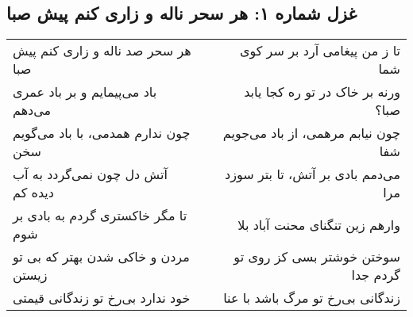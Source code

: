 \begin{center}
\section*{غزل شماره ۱: هر سحر ناله و زاری کنم پیش صبا}
\label{sec:001}
\begin{longtable}{l p{0.5cm} r}
هر سحر صد ناله و زاری کنم پیش صبا
&&
تا ز من پیغامی آرد بر سر کوی شما
\\
باد می‌پیمایم و بر باد عمری می‌دهم
&&
ورنه بر خاک در تو ره کجا یابد صبا؟
\\
چون ندارم همدمی، با باد می‌گویم سخن
&&
چون نیابم مرهمی، از باد می‌جویم شفا
\\
آتش دل چون نمی‌گردد به آب دیده کم
&&
می‌دمم بادی بر آتش، تا بتر سوزد مرا
\\
تا مگر خاکستری گردم به بادی بر شوم
&&
وارهم زین تنگنای محنت آباد بلا
\\
مردن و خاکی شدن بهتر که بی تو زیستن
&&
سوختن خوشتر بسی کز روی تو گردم جدا
\\
خود ندارد بی‌رخ تو زندگانی قیمتی
&&
زندگانی بی‌رخ تو مرگ باشد با عنا
\\
\end{longtable}
\end{center}
